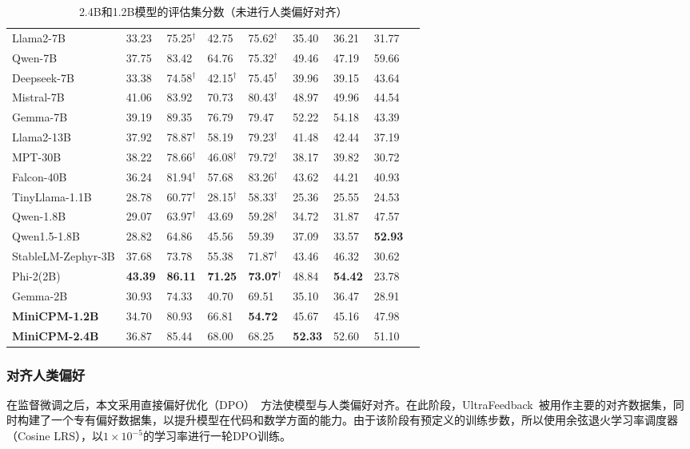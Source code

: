\begin{table}[!htbp]
{\begin{tabular}{lm{1.2cm}m{1.2cm}m{1.2cm}m{1.7cm}m{1.2cm}m{1.2cm}m{1.2cm}m{1.2cm}}
\midrule
Llama2-7B  & 33.23 & 75.25$^{\dag}$ & 42.75 & 75.62$^{\dag}$ & 35.40 & 36.21 & 31.77 \\
Qwen-7B  & 37.75 & 83.42 & 64.76 & 75.32$^{\dag}$ & 49.46 & 47.19 & 59.66 \\
Deepseek-7B  & 33.38 & 74.58$^{\dag}$ & 42.15$^{\dag}$ & 75.45$^{\dag}$ & 39.96 & 39.15 & 43.64 \\
Mistral-7B & 41.06 & 83.92 & 70.73 & 80.43$^{\dag}$ & 48.97 & 49.96 & 44.54 \\
Gemma-7B  & 39.19 & 89.35 & 76.79 & 79.47 & 52.22 & 54.18 & 43.39 \\
\midrule
Llama2-13B & 37.92 & 78.87$^{\dag}$ & 58.19 & 79.23$^{\dag}$ & 41.48 & 42.44 & 37.19 \\
MPT-30B  & 38.22 & 78.66$^{\dag}$ & 46.08$^{\dag}$ & 79.72$^{\dag}$ & 38.17 & 39.82 & 30.72 \\
Falcon-40B & 36.24 & 81.94$^{\dag}$ & 57.68 & 83.26$^{\dag}$ & 43.62 & 44.21 & 40.93 \\
\midrule
TinyLlama-1.1B  & 28.78 & 60.77$^{\dag}$ & 28.15$^{\dag}$ & 58.33$^{\dag}$ & 25.36 & 25.55 & 24.53 \\
Qwen-1.8B  & 29.07 & 63.97$^{\dag}$ & 43.69 & 59.28$^{\dag}$ & 34.72 & 31.87 & 47.57 \\
Qwen1.5-1.8B  & 28.82 & 64.86 & 45.56 & 59.39 & 37.09 & 33.57 & \textbf{52.93} \\
StableLM-Zephyr-3B  & 37.68 & 73.78 & 55.38 & 71.87$^{\dag}$ & 43.46 & 46.32 & 30.62 \\
Phi-2(2B)  & \textbf{43.39} & \textbf{86.11} & \textbf{71.25} & \textbf{73.07$^{\dag}$} & 48.84 & \textbf{54.42} & 23.78 \\
Gemma-2B  & 30.93 & 74.33 & 40.70 & 69.51 & 35.10 & 36.47 & 28.91\\
\midrule
\textbf{MiniCPM-1.2B}  & 34.70 & 80.93 & 66.81 &  \textbf{54.72} &  45.67 & 45.16 & 47.98 \\
\textbf{MiniCPM-2.4B}  & 36.87 & 85.44 & 68.00 & 68.25 & \textbf{52.33} & 52.60 & 51.10 \\
\bottomrule
\end{tabular}
}
\caption{2.4B和1.2B模型的评估集分数（未进行人类偏好对齐）}
\label{tab:benchmark}
\end{table}

\subsubsection{对齐人类偏好}
\label{app:rlhf}
在监督微调之后，本文采用直接偏好优化（DPO）~\citep{rafailov2024direct}方法使模型与人类偏好对齐。在此阶段，UltraFeedback~\citep{cui2023ultrafeedback}被用作主要的对齐数据集，同时构建了一个专有偏好数据集，以提升模型在代码和数学方面的能力。由于该阶段有预定义的训练步数，所以使用余弦退火学习率调度器（Cosine LRS），以$1\times 10^{-5}$的学习率进行一轮DPO训练。

